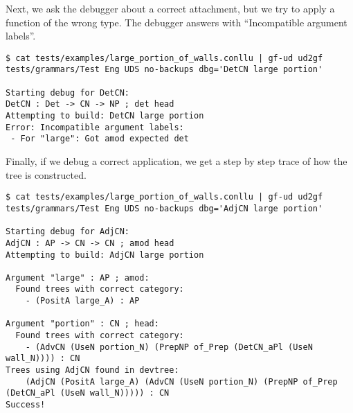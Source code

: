 Next, we ask the debugger about a correct attachment, but we try to apply a function of the wrong type. The debugger answers with ``Incompatible argument labels''.


\begin{lstlisting}
$ cat tests/examples/large_portion_of_walls.conllu | gf-ud ud2gf tests/grammars/Test Eng UDS no-backups dbg='DetCN large portion'

Starting debug for DetCN:
DetCN : Det -> CN -> NP ; det head
Attempting to build: DetCN large portion
Error: Incompatible argument labels:
 - For "large": Got amod expected det
\end{lstlisting}

Finally, if we debug a correct application, we get a step by step trace of how the tree is constructed.

\begin{lstlisting}
$ cat tests/examples/large_portion_of_walls.conllu | gf-ud ud2gf tests/grammars/Test Eng UDS no-backups dbg='AdjCN large portion'

Starting debug for AdjCN:
AdjCN : AP -> CN -> CN ; amod head
Attempting to build: AdjCN large portion

Argument "large" : AP ; amod:
  Found trees with correct category:
    - (PositA large_A) : AP

Argument "portion" : CN ; head:
  Found trees with correct category:
    - (AdvCN (UseN portion_N) (PrepNP of_Prep (DetCN_aPl (UseN wall_N)))) : CN
Trees using AdjCN found in devtree:
    (AdjCN (PositA large_A) (AdvCN (UseN portion_N) (PrepNP of_Prep (DetCN_aPl (UseN wall_N))))) : CN
Success!
\end{lstlisting}



